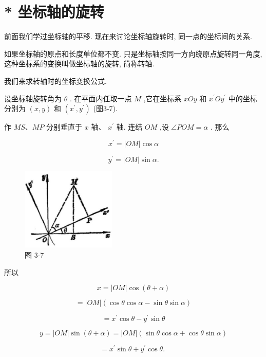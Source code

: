 \documentclass[lang=cn,newtx,10pt,scheme=chinese]{elegantbook}
\begin{document}
\section{* 坐标轴的旋转}

前面我们学过坐标轴的平移. 现在来讨论坐标轴旋转时, 同一点的坐标间的关系.

如果坐标轴的原点和长度单位都不变. 只是坐标轴按同一方向绕原点旋转同一角度, 这种坐标系的变换叫做坐标轴的旋转, 简称转轴.

我们来求转轴时的坐标变换公式.

设坐标轴旋转角为 \(\theta\) . 在平面内任取一点 \(M\) ,它在坐标系 \({xOy}\) 和 \({x}^{\prime }O{y}^{\prime }\) 中的坐标分别为 \(\left( {x,y}\right)\) 和 \(\left( {{x}^{\prime },{y}^{\prime }}\right)\) (图3-7).

作 \({MS}\text{、}{MP}\) 分别垂直于 \(x\) 轴、 \({x}^{\prime }\) 轴. 连结 \({OM}\) ,设 \(\angle {POM} = \alpha\) . 那么

\[
    {x}^{\prime } = \left| {OM}\right| \cos \alpha
\]

\[
    {y}^{\prime } = \left| {OM}\right| \sin \alpha \text{.}
\]

\begin{figure}[h]
  \centering
  \includegraphics[max width=0.4\textwidth]{images/01912cc2-ffb6-728e-9ae7-b113ff05c64b_140_958258.jpg}
  \caption{图 3-7}
\end{figure}



所以

\[
  x = \left| {OM}\right| \cos \left( {\theta + \alpha }\right)
\]

\[
  = \left| {OM}\right| \left( {\cos \theta \cos \alpha - \sin \theta \sin \alpha }\right)
\]

\[
  = {x}^{\prime }\cos \theta - {y}^{\prime }\sin \theta
\]

\[
  y = \left| {OM}\right| \sin \left( {\theta + \alpha }\right) = \left| {OM}\right| \left( {\sin \theta \cos \alpha + \cos \theta \sin \alpha }\right)
\]

\[
  = {x}^{\prime }\sin \theta + {y}^{\prime }\cos \theta \text{. }
\]
\end{document}
